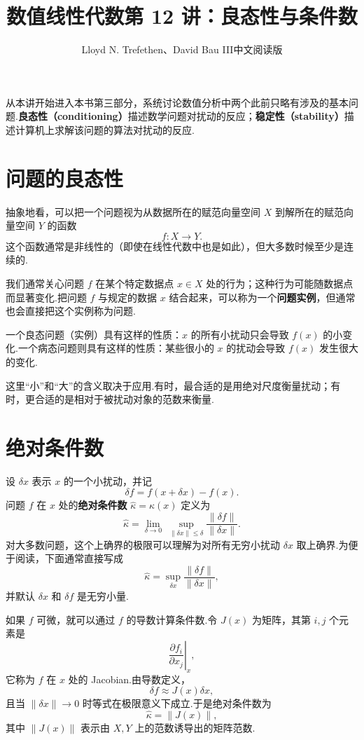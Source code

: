 \documentclass[UTF8,fontset=none,12pt]{ctexart}
\title{数值线性代数\quad 第 12 讲：良态性与条件数}
\author{Lloyd N. Trefethen、David Bau III\quad 中文阅读版}
\date{}
\theoremstyle{definition}
\begin{document}
\maketitle
\pagestyle{plain}

从本讲开始进入本书第三部分，系统讨论数值分析中两个此前只略有涉及的基本问题.\textbf{良态性（conditioning）}描述数学问题对扰动的反应；\textbf{稳定性（stability）}描述计算机上求解该问题的算法对扰动的反应.

\section*{问题的良态性}

抽象地看，可以把一个问题视为从数据所在的赋范向量空间 $X$ 到解所在的赋范向量空间 $Y$ 的函数
\[
    f:X\to Y.
\]
这个函数通常是非线性的（即使在线性代数中也是如此），但大多数时候至少是连续的.

我们通常关心问题 $f$ 在某个特定数据点 $x\in X$ 处的行为；这种行为可能随数据点而显著变化.把问题 $f$ 与规定的数据 $x$ 结合起来，可以称为一个\textbf{问题实例}，但通常也会直接把这个实例称为问题.

一个良态问题（实例）具有这样的性质：$x$ 的所有小扰动只会导致 $f(x)$ 的小变化.一个病态问题则具有这样的性质：某些很小的 $x$ 的扰动会导致 $f(x)$ 发生很大的变化.

这里“小”和“大”的含义取决于应用.有时，最合适的是用绝对尺度衡量扰动；有时，更合适的是相对于被扰动对象的范数来衡量.

\section*{绝对条件数}

设 $\delta x$ 表示 $x$ 的一个小扰动，并记
\[
    \delta f=f(x+\delta x)-f(x).
\]
问题 $f$ 在 $x$ 处的\textbf{绝对条件数} $\widehat\kappa=\widehat\kappa(x)$ 定义为
\begin{equation}
    \widehat\kappa
    =\lim_{\delta\to0}\ 
    \sup_{\|\delta x\|\le\delta}
    \frac{\|\delta f\|}{\|\delta x\|}.
    \tag{12.1}
\end{equation}
对大多数问题，这个上确界的极限可以理解为对所有无穷小扰动 $\delta x$ 取上确界.为便于阅读，下面通常直接写成
\begin{equation}
    \widehat\kappa=\sup_{\delta x}\frac{\|\delta f\|}{\|\delta x\|},
    \tag{12.2}
\end{equation}
并默认 $\delta x$ 和 $\delta f$ 是无穷小量.

如果 $f$ 可微，就可以通过 $f$ 的导数计算条件数.令 $J(x)$ 为矩阵，其第 $i,j$ 个元素是
\[
    \left.\frac{\partial f_i}{\partial x_j}\right|_x,
\]
它称为 $f$ 在 $x$ 处的 Jacobian.由导数定义，
\[
    \delta f\approx J(x)\delta x,
\]
且当 $\|\delta x\|\to0$ 时等式在极限意义下成立.于是绝对条件数为
\begin{equation}
    \widehat\kappa=\|J(x)\|,
    \tag{12.3}
\end{equation}
其中 $\|J(x)\|$ 表示由 $X,Y$ 上的范数诱导出的矩阵范数.
\end{document}
